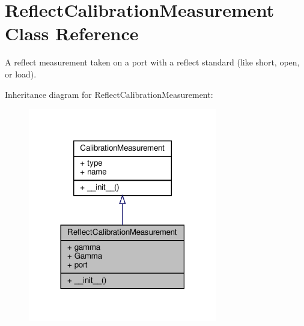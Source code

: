 \hypertarget{classSignalIntegrity_1_1Measurement_1_1Calibration_1_1CalibrationMeasurements_1_1ReflectCalibrationMeasurement}{}\section{Reflect\+Calibration\+Measurement Class Reference}
\label{classSignalIntegrity_1_1Measurement_1_1Calibration_1_1CalibrationMeasurements_1_1ReflectCalibrationMeasurement}


A reflect measurement taken on a port with a reflect standard (like short, open, or load).  




Inheritance diagram for Reflect\+Calibration\+Measurement\+:\nopagebreak
\begin{figure}[H]
\begin{center}
\leavevmode
\includegraphics[width=234pt]{classSignalIntegrity_1_1Measurement_1_1Calibration_1_1CalibrationMeasurements_1_1ReflectCalibrationMeasurement__inherit__graph}
\end{center}
\end{figure}


